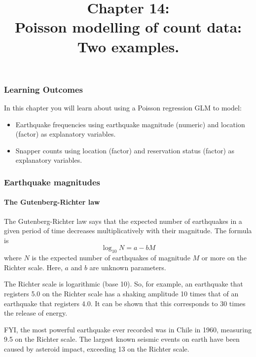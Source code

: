 \documentclass{beamer}\usepackage[]{graphicx}\usepackage[]{xcolor}
\begin{document}
\newcommand{\thechapter}{14}

\title{Chapter \thechapter: \\ Poisson modelling of count data: \newline Two examples.}




\begin{frame}
\titlepage
\end{frame}



\begin{frame}[t]
\frametitle{Learning Outcomes}
In this chapter you will learn about using a Poisson regression GLM to model:
\begin{center}
\vspace{16pt}
\begin{minipage}{0.9\textwidth}
  \begin{itemize}
    \item Earthquake frequencies using earthquake magnitude (numeric) and location (factor) as explanatory variables.
    \item Snapper counts using location (factor) and reservation status (factor) as explanatory variables.
  \end{itemize}
\end{minipage}
\end{center}

\end{frame}





\begin{frame}
\frametitle{Earthquake magnitudes}
\framesubtitle{The Gutenberg-Richter law}

The Gutenberg-Richter law says that the expected number of earthquakes in a given period of time
decreases multiplicatively with their magnitude.
The formula is
\[ \log_{10} N = a - b M \]
where $N$ is the expected number of earthquakes of magnitude $M$ or more
on the Richter scale. 
Here, $a$ and $b$ are unknown parameters.

\medskip
The Richter scale is logarithmic (base 10). 
So, for example, an earthquake that registers 5.0 on the Richter scale has a shaking amplitude 10 times that of an earthquake that registers 4.0. It can be shown that this corresponds to 30 times the release of energy.

\medskip
FYI, the most powerful earthquake ever recorded was in Chile in 1960, measuring 9.5 on the
Richter scale.
The largest known seismic events on earth have been caused by asteroid impact,
exceeding 13 on the Richter scale.
\end{frame}
\end{document}
